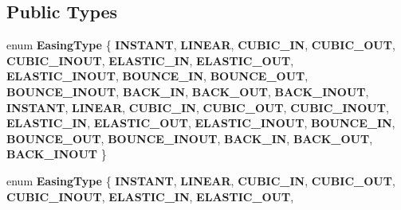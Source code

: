 \subsection*{Public Types}
\begin{DoxyCompactItemize}
\item 
\mbox{\label{classcocosbuilder_1_1CCBKeyframe_a5985ca698c6fcfd3a090f912f10afa01}} 
enum {\bfseries Easing\+Type} \{ \newline
{\bfseries I\+N\+S\+T\+A\+NT}, 
{\bfseries L\+I\+N\+E\+AR}, 
{\bfseries C\+U\+B\+I\+C\+\_\+\+IN}, 
{\bfseries C\+U\+B\+I\+C\+\_\+\+O\+UT}, 
\newline
{\bfseries C\+U\+B\+I\+C\+\_\+\+I\+N\+O\+UT}, 
{\bfseries E\+L\+A\+S\+T\+I\+C\+\_\+\+IN}, 
{\bfseries E\+L\+A\+S\+T\+I\+C\+\_\+\+O\+UT}, 
{\bfseries E\+L\+A\+S\+T\+I\+C\+\_\+\+I\+N\+O\+UT}, 
\newline
{\bfseries B\+O\+U\+N\+C\+E\+\_\+\+IN}, 
{\bfseries B\+O\+U\+N\+C\+E\+\_\+\+O\+UT}, 
{\bfseries B\+O\+U\+N\+C\+E\+\_\+\+I\+N\+O\+UT}, 
{\bfseries B\+A\+C\+K\+\_\+\+IN}, 
\newline
{\bfseries B\+A\+C\+K\+\_\+\+O\+UT}, 
{\bfseries B\+A\+C\+K\+\_\+\+I\+N\+O\+UT}, 
{\bfseries I\+N\+S\+T\+A\+NT}, 
{\bfseries L\+I\+N\+E\+AR}, 
\newline
{\bfseries C\+U\+B\+I\+C\+\_\+\+IN}, 
{\bfseries C\+U\+B\+I\+C\+\_\+\+O\+UT}, 
{\bfseries C\+U\+B\+I\+C\+\_\+\+I\+N\+O\+UT}, 
{\bfseries E\+L\+A\+S\+T\+I\+C\+\_\+\+IN}, 
\newline
{\bfseries E\+L\+A\+S\+T\+I\+C\+\_\+\+O\+UT}, 
{\bfseries E\+L\+A\+S\+T\+I\+C\+\_\+\+I\+N\+O\+UT}, 
{\bfseries B\+O\+U\+N\+C\+E\+\_\+\+IN}, 
{\bfseries B\+O\+U\+N\+C\+E\+\_\+\+O\+UT}, 
\newline
{\bfseries B\+O\+U\+N\+C\+E\+\_\+\+I\+N\+O\+UT}, 
{\bfseries B\+A\+C\+K\+\_\+\+IN}, 
{\bfseries B\+A\+C\+K\+\_\+\+O\+UT}, 
{\bfseries B\+A\+C\+K\+\_\+\+I\+N\+O\+UT}
 \}
\item 
\mbox{\label{classcocosbuilder_1_1CCBKeyframe_a5985ca698c6fcfd3a090f912f10afa01}} 
enum {\bfseries Easing\+Type} \{ \newline
{\bfseries I\+N\+S\+T\+A\+NT}, 
{\bfseries L\+I\+N\+E\+AR}, 
{\bfseries C\+U\+B\+I\+C\+\_\+\+IN}, 
{\bfseries C\+U\+B\+I\+C\+\_\+\+O\+UT}, 
\newline
{\bfseries C\+U\+B\+I\+C\+\_\+\+I\+N\+O\+UT}, 
{\bfseries E\+L\+A\+S\+T\+I\+C\+\_\+\+IN}, 
{\bfseries E\+L\+A\+S\+T\+I\+C\+\_\+\+O\+UT}, 

\end{DoxyCompactItemize}
